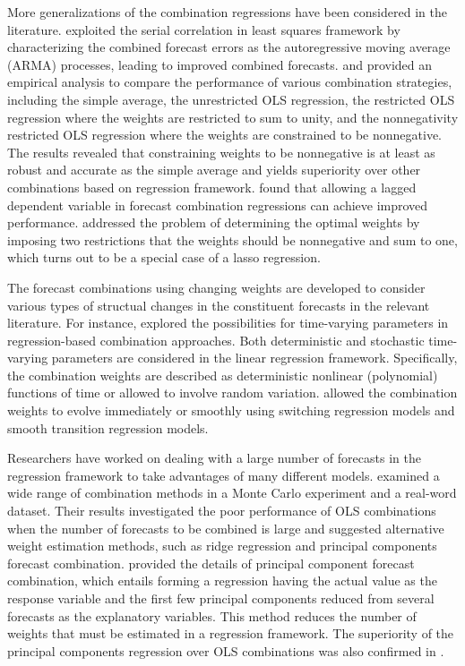 \documentclass[11pt]{article}
\begin{document}
More generalizations of the combination regressions have been considered in the literature. \cite{Diebold1988-sx} exploited the serial correlation in least squares framework by characterizing the combined forecast errors as the autoregressive moving average (ARMA) processes, leading to improved combined forecasts. \cite{Gunter1992-go} and \cite{Aksu1992-lb} provided an empirical analysis to compare the performance of various combination strategies, including the simple average, the unrestricted OLS regression, the restricted OLS regression where the weights are restricted to sum to unity, and the nonnegativity restricted OLS regression where the weights are constrained to be nonnegative. The results revealed that constraining weights to be nonnegative  is at least as robust and accurate as the simple average and yields superiority over other combinations based on regression framework. \cite{Edward_Coulson1993-db} found that allowing a lagged dependent variable in forecast combination regressions can achieve improved performance. \cite{Conflitti2015-fq} addressed the problem of determining the optimal weights by imposing two restrictions that the weights should be nonnegative and sum to one, which turns out to be a special case of a lasso regression.

The forecast combinations using changing weights are developed to consider various types of structual changes in the constituent forecasts in the relevant literature. For instance, \cite{Diebold1987-go} explored the possibilities for time-varying parameters in regression-based combination approaches. Both deterministic and stochastic time-varying parameters are considered in the linear regression framework. Specifically, the combination weights are described as deterministic nonlinear (polynomial) functions of time or allowed to involve random variation. \cite{Deutsch1994-ob} allowed the combination weights to evolve immediately or smoothly using switching regression models and smooth transition regression models.

Researchers have worked on dealing with a large number of forecasts in the regression framework to take advantages of many different models. \cite{Chan1999-io} examined a wide range of combination methods in a Monte Carlo experiment and a real-word dataset. Their results investigated the poor performance of OLS combinations when the number of forecasts to be combined is large and suggested alternative weight estimation methods, such as ridge regression and principal components forecast combination. \cite{Stock2004-rq} provided the details of principal component forecast combination, which entails forming a regression having the actual value as the response variable and the first few principal components reduced from several forecasts as the explanatory variables. This method reduces the number of weights that must be estimated in a regression framework. The superiority of the principal components regression over OLS combinations was also confirmed in \cite{Rapach2008-jh}.
\end{document}
